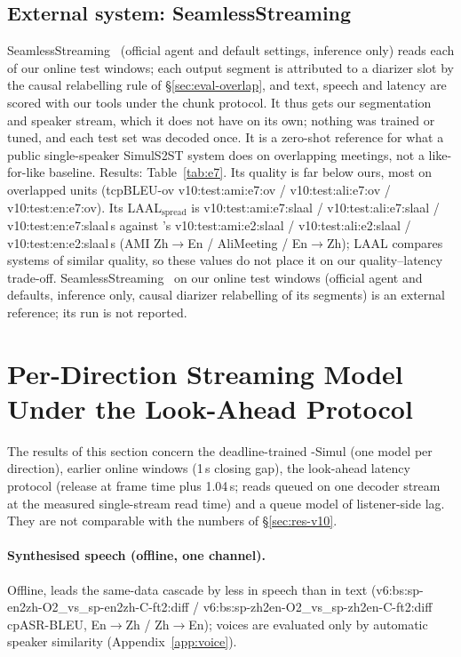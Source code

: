 \subsection{External system: SeamlessStreaming}
\label{app:e7}

\ifEseven
SeamlessStreaming~\citep{seamless2023} (official agent and default settings, inference only) reads each of our online
test windows; each output segment is attributed to a diarizer slot by the causal relabelling rule of
\S\ref{sec:eval-overlap}, and text, speech and latency are scored with our tools under the chunk protocol. It thus gets our
segmentation and speaker stream, which it does not have on its own; nothing was trained or tuned, and each test set was
decoded once. It is a zero-shot reference for what a public single-speaker SimulS2ST system does on overlapping
meetings, not a like-for-like baseline. Results: Table~\ref{tab:e7}.
 Its quality is far below ours, most on
overlapped units (tcpBLEU-ov \num{v10:test:ami:e7:ov} / \num{v10:test:ali:e7:ov} / \num{v10:test:en:e7:ov}). Its
LAAL$_\text{spread}$ is \num{v10:test:ami:e7:slaal} / \num{v10:test:ali:e7:slaal} / \num{v10:test:en:e7:slaal}\,s against \sys{}'s
\num{v10:test:ami:e2:slaal} / \num{v10:test:ali:e2:slaal} / \num{v10:test:en:e2:slaal}\,s (AMI Zh$\rightarrow$En /
AliMeeting / En$\rightarrow$Zh); LAAL compares systems of similar quality, so these values do not place it on our
quality--latency trade-off.
\else
SeamlessStreaming~\citep{seamless2023} on our online test windows (official agent and defaults, inference only, causal
diarizer relabelling of its segments) is an external reference; its run is not reported.
\fi

\section{Per-Direction Streaming Model Under the Look-Ahead Protocol}
\label{app:v9proto}

The results of this section concern the deadline-trained \sys{}-Simul (one model per direction), earlier online windows
(1\,s closing gap), the look-ahead latency protocol (release at frame time plus 1.04\,s; reads queued on one decoder
stream at the measured single-stream read time) and a queue model of listener-side lag. They are not comparable with the
numbers of \S\ref{sec:res-v10}.



\paragraph{Synthesised speech (offline, one channel).} Offline, \sys{} leads the same-data cascade by less in speech than in
text (\num{v6:bs:sp-en2zh-O2_vs_sp-en2zh-C-ft2:diff} / \num{v6:bs:sp-zh2en-O2_vs_sp-zh2en-C-ft2:diff} cpASR-BLEU,
En$\rightarrow$Zh / Zh$\rightarrow$En); voices are evaluated only by automatic speaker similarity
(Appendix~\ref{app:voice}).

